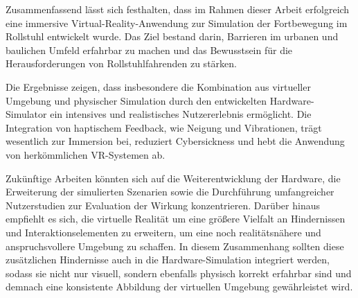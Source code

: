 Zusammenfassend lässt sich festhalten, dass im Rahmen dieser Arbeit erfolgreich eine immersive Virtual-Reality-Anwendung zur Simulation der Fortbewegung im Rollstuhl entwickelt wurde. Das Ziel bestand darin, Barrieren im urbanen und baulichen Umfeld erfahrbar zu machen und das Bewusstsein für die Herausforderungen von Rollstuhlfahrenden zu stärken.

Die Ergebnisse zeigen, dass insbesondere die Kombination aus virtueller Umgebung und physischer Simulation durch den entwickelten Hardware-Simulator ein intensives und realistisches Nutzererlebnis ermöglicht. Die Integration von haptischem Feedback, wie Neigung und Vibrationen, trägt wesentlich zur Immersion bei, reduziert Cybersickness und hebt die Anwendung von herkömmlichen VR-Systemen ab.

Zukünftige Arbeiten könnten sich auf die Weiterentwicklung der Hardware, die Erweiterung der simulierten Szenarien sowie die Durchführung umfangreicher Nutzerstudien zur Evaluation der Wirkung konzentrieren.
Darüber hinaus empfiehlt es sich, die virtuelle Realität um eine größere Vielfalt an Hindernissen und Interaktionselementen zu erweitern, um eine noch realitätsnähere und anspruchsvollere Umgebung zu schaffen. In diesem Zusammenhang sollten diese zusätzlichen Hindernisse auch in die Hardware-Simulation integriert werden, sodass sie nicht nur visuell, sondern ebenfalls physisch korrekt erfahrbar sind und demnach eine konsistente Abbildung der virtuellen Umgebung gewährleistet wird.